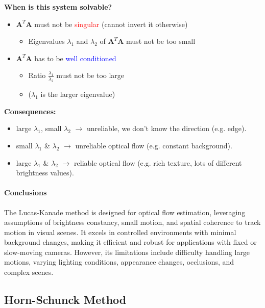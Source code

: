 \documentclass{article}
\begin{document}
\begin{multicols}{2}
	\textbf{When is this system solvable?}
	\begin{itemize}
		\item \( \mathbf{A}^T\mathbf{A} \) must not be \textcolor{red}{singular} (cannot invert it otherwise)
		      \begin{itemize}
			      \item Eigenvalues \( \lambda_1 \) and \( \lambda_2 \) of \( \mathbf{A}^T\mathbf{A} \) must not be too small
		      \end{itemize}
		\item \( \mathbf{A}^T\mathbf{A} \) has to be \textcolor{blue}{well conditioned}
		      \begin{itemize}
			      \item Ratio \( \frac{\lambda_1}{\lambda_2} \) must not be too large
			      \item (\( \lambda_1 \) is the larger eigenvalue)
		      \end{itemize}
	\end{itemize}

	\textbf{Consequences:}
	\begin{itemize}
		\item large \( \lambda_1 \), small \( \lambda_2 \) \(\rightarrow\) unreliable, we don't know the direction (e.g. edge).
		\item small \( \lambda_1 \) \& \( \lambda_2 \)  \(\rightarrow\) unreliable optical flow (e.g. constant background).
		\item large \( \lambda_1 \) \& \( \lambda_2 \) \(\rightarrow\) reliable optical flow (e.g. rich texture, lots of different brightness values).
	\end{itemize}



	\paragraph{Conclusions}

	The Lucas-Kanade method is designed for optical flow estimation, leveraging assumptions of brightness constancy, small motion, and spatial coherence to track motion in visual scenes.
	It excels in controlled environments with minimal background changes, making it efficient and robust for applications with fixed or slow-moving cameras.
	However, its limitations include difficulty handling large motions, varying lighting conditions, appearance changes, occlusions, and complex scenes.


	\subsection{Horn-Schunck Method}


\end{multicols}
\end{document}
